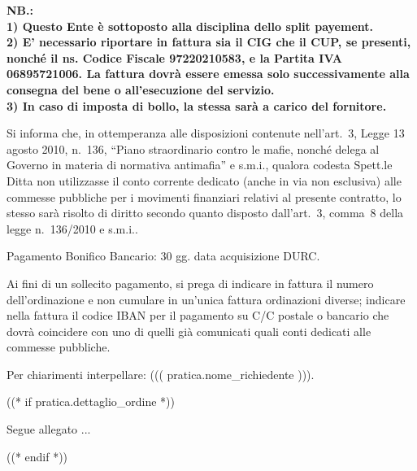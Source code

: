 \documentclass[a4paper,12pt]{letter}
\begin{document}
{\tiny\bf NB.: \\
1) Questo Ente è sottoposto alla disciplina dello split payement. \\
2) E' necessario riportare in fattura sia il CIG che il CUP, se presenti,
nonché il ns. Codice Fiscale 97220210583, e la Partita IVA 06895721006.
La fattura dovrà essere emessa solo successivamente alla consegna del bene o all’esecuzione del servizio.\\
3) In caso di imposta di bollo, la stessa sarà a carico del fornitore.

Si informa che, in ottemperanza alle disposizioni contenute nell'art.~3, Legge 13 agosto 2010, n.~136,
``Piano straordinario contro le mafie, nonch\'e delega al Governo in materia di normativa antimafia''
e s.m.i., qualora codesta Spett.le Ditta non utilizzasse il conto corrente dedicato 
(anche in via non esclusiva) alle commesse pubbliche per i movimenti finanziari 
relativi al presente contratto, lo stesso sarà risolto di diritto secondo quanto 
disposto dall'art.~3, comma~8 della legge n.~136/2010 e s.m.i..

Pagamento Bonifico Bancario: 30 gg. data acquisizione DURC.

Ai fini di un sollecito pagamento, si prega di
indicare in fattura il numero dell'ordinazione e non cumulare in un'unica fattura 
ordinazioni diverse;
indicare nella fattura il codice IBAN per il pagamento su C/C postale o bancario 
che dovrà coincidere con uno di quelli già comunicati quali conti dedicati alle commesse pubbliche.

Per chiarimenti interpellare: ((( pratica.nome_richiedente ))).
}

((* if pratica.dettaglio_ordine *))
\vspace{0.5cm}
\begin{flushright}
Segue allegato ...
\end{flushright}

\newpage
\vspace{2cm}
\quad
((* endif *))

\vspace{1cm}
\end{document}
